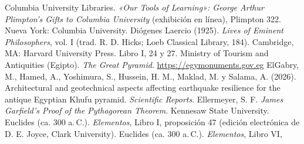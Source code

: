 \documentclass[11pt]{article}
\begin{document}
\seguimientodocente

\begin{referencias}
 Columbia University Libraries. \emph{«Our Tools of
  Learning»: George Arthur Plimpton's Gifts to Columbia University}
  (exhibición en línea), Plimpton 322. Nueva York: Columbia University.
 Diógenes Laercio (1925). \emph{Lives of Eminent
  Philosophers}, vol. I (trad. R. D. Hicks; Loeb Classical Library, 184).
  Cambridge, MA: Harvard University Press. Libro I, 24 y 27.
 Ministry of Tourism and Antiquities (Egipto). \emph{The
  Great Pyramid}. \url{https://egymonuments.gov.eg}
 ElGabry, M., Hamed, A., Yoshimura, S., Hussein, H. M.,
  Maklad, M. y Salama, A. (2026). Architectural and geotechnical aspects
  affecting earthquake resilience for the antique Egyptian Khufu pyramid.
  \emph{Scientific Reports}.
 Ellermeyer, S. F. \emph{James Garfield's Proof of the
  Pythagorean Theorem}. Kennesaw State University.
 Euclides (ca. 300 a.\,C.). \emph{Elementos}, Libro I,
  proposición 47 (edición electrónica de D. E. Joyce, Clark University).
 Euclides (ca. 300 a.\,C.). \emph{Elementos}, Libro VI,

\end{referencias}
\end{document}
